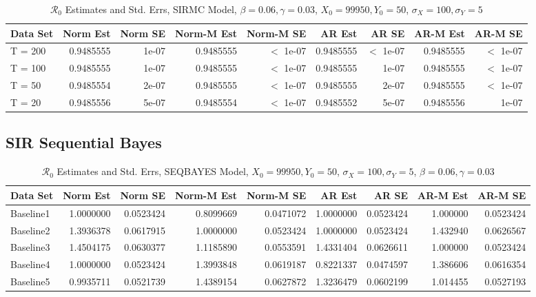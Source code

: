 \documentclass[12pt]{article}
\newcommand{\rr}{\ensuremath{\mathcal{R}_0}}
\begin{document}
\begin{table}[H]
	
	\caption{\label{tab:}$\rr$ Estimates and Std. Errs, SIRMC Model,
		$\beta = 0.06, \gamma = 0.03$, $X_0 = 99950, Y_0 = 50$, $\sigma_X = 100, \sigma_Y = 5$}
	\centering
	\begin{tabular}[t]{l|r|r|r|r|r|r|r|r}
		\hline
		Data Set & Norm Est & Norm SE & Norm-M Est & Norm-M SE & AR Est & AR SE & AR-M Est & AR-M SE\\
		\hline
		T = 200 & 0.9485555 & 1e-07 & 0.9485555 & $<$ 1e-07 & 0.9485555 & $<$ 1e-07 & 0.9485555 & $<$ 1e-07\\
		\hline
		T = 100 & 0.9485555 & 1e-07 & 0.9485555 & $<$ 1e-07 & 0.9485555 & 1e-07 & 0.9485555 & $<$ 1e-07\\
		\hline
		T = 50 & 0.9485554 & 2e-07 & 0.9485555 & $<$ 1e-07 & 0.9485555 & 2e-07 & 0.9485555 & $<$ 1e-07\\
		\hline
		T = 20 & 0.9485556 & 5e-07 & 0.9485554 & $<$ 1e-07 & 0.9485552 & 5e-07 & 0.9485556 & 1e-07\\
		\hline
	\end{tabular}
\end{table}

\subsection{SIR Sequential Bayes}

\begin{table}[H]
	
	\caption{\label{tab:}$\rr$ Estimates and Std. Errs, SEQBAYES Model,
		$X_0 = 99950, Y_0 = 50$, $\sigma_X = 100, \sigma_Y = 5$, $\beta = 0.06, \gamma = 0.03$}
	\centering
	\begin{footnotesize}
	\begin{tabular}[t]{l|r|r|r|r|r|r|r|r}
		\hline
		Data Set & Norm Est & Norm SE & Norm-M Est & Norm-M SE & AR Est & AR SE & AR-M Est & AR-M SE\\
		\hline
		Baseline1 & 1.0000000 & 0.0523424 & 0.8099669 & 0.0471072 & 1.0000000 & 0.0523424 & 1.000000 & 0.0523424\\
		\hline
		Baseline2 & 1.3936378 & 0.0617915 & 1.0000000 & 0.0523424 & 1.0000000 & 0.0523424 & 1.432940 & 0.0626567\\
		\hline
		Baseline3 & 1.4504175 & 0.0630377 & 1.1185890 & 0.0553591 & 1.4331404 & 0.0626611 & 1.000000 & 0.0523424\\
		\hline
		Baseline4 & 1.0000000 & 0.0523424 & 1.3993848 & 0.0619187 & 0.8221337 & 0.0474597 & 1.386606 & 0.0616354\\
		\hline
		Baseline5 & 0.9935711 & 0.0521739 & 1.4389154 & 0.0627872 & 1.3236479 & 0.0602199 & 1.014455 & 0.0527193\\
		\hline
	\end{tabular}
\end{footnotesize}
\end{table}
\end{document}
